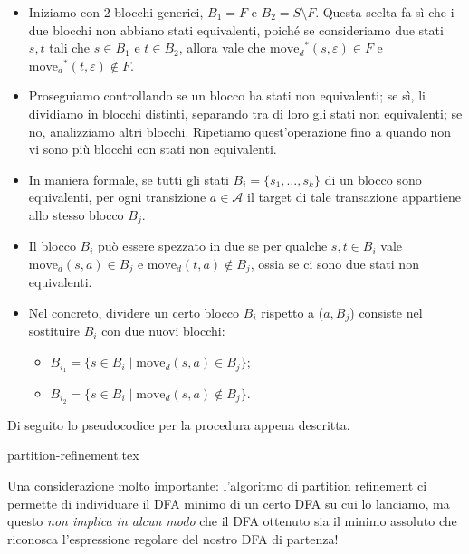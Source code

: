 \documentclass[class=book, crop=false, oneside, 12pt]{standalone}
\begin{document}
\begin{itemize}
    \item Iniziamo con \(2\) blocchi generici, \(B_{1}=F\) e \(B_{2}=S\setminus F\). Questa scelta fa sì che i due blocchi non abbiano stati equivalenti, poiché se consideriamo due stati \(s, t\) tali che \(s\in B_{1}\) e \(t\in B_{2}\), allora vale che \(\textrm{move}_{d}\!^{*}(s,\varepsilon)\in F\) e \(\textrm{move}_{d}\!^{*}(t,\varepsilon)\notin F\).
    \item Proseguiamo controllando se un blocco ha stati non equivalenti; se sì, li dividiamo in blocchi distinti, separando tra di loro gli stati non equivalenti; se no, analizziamo altri blocchi. Ripetiamo quest'operazione fino a quando non vi sono più blocchi con stati non equivalenti.
    \item In maniera formale, se tutti gli stati \(B_{i}=\{s_{1}, \ldots, s_{k}\}\) di un blocco sono equivalenti, per ogni transizione \(a \in \mathcal{A}\) il target di tale transazione appartiene allo stesso blocco \(B_j\).
    \item Il blocco \(B_{i}\) può essere spezzato in due se per qualche \(s,t \in B_{i}\) vale \(\textrm{move}_{d}(s,a)\in B_{j}\) e \(\textrm{move}_{d}(t,a)\notin B_{j}\), ossia se ci sono due stati non equivalenti.
    \item Nel concreto, dividere un certo blocco \(B_{i}\) rispetto a (\(a,B_{j}\)) consiste nel sostituire \(B_{i}\) con due nuovi blocchi:
    \begin{itemize}
        \item \( B_{i_1} = \{s \in B_{i} \mid \textrm{move}_{d}(s,a)\in B_j\}\);
        \item \( B_{i_2} = \{s \in B_{i} \mid \textrm{move}_{d}(s,a)\notin B_j\}\).
    \end{itemize}
\end{itemize}
Di seguito lo pseudocodice per la procedura appena descritta.

{partition-refinement.tex}

Una considerazione molto importante: l'algoritmo di partition refinement ci permette di individuare il DFA minimo di un certo DFA su cui lo lanciamo, ma questo \emph{non implica in alcun modo} che il DFA ottenuto sia il minimo assoluto che riconosca l'espressione regolare del nostro DFA di partenza!
\end{document}
